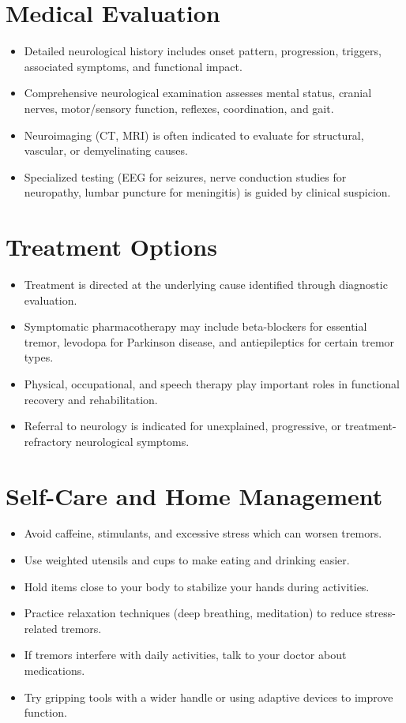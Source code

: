 \section*{Medical Evaluation}
\begin{itemize}
  \item Detailed neurological history includes onset pattern, progression, triggers, associated symptoms, and functional impact.
  \item Comprehensive neurological examination assesses mental status, cranial nerves, motor/sensory function, reflexes, coordination, and gait.
  \item Neuroimaging (CT, MRI) is often indicated to evaluate for structural, vascular, or demyelinating causes.
  \item Specialized testing (EEG for seizures, nerve conduction studies for neuropathy, lumbar puncture for meningitis) is guided by clinical suspicion.
\end{itemize}

\section*{Treatment Options}
\begin{itemize}
  \item Treatment is directed at the underlying cause identified through diagnostic evaluation.
  \item Symptomatic pharmacotherapy may include beta-blockers for essential tremor, levodopa for Parkinson disease, and antiepileptics for certain tremor types.
  \item Physical, occupational, and speech therapy play important roles in functional recovery and rehabilitation.
  \item Referral to neurology is indicated for unexplained, progressive, or treatment-refractory neurological symptoms.
\end{itemize}

\section*{Self-Care and Home Management}
\begin{itemize}
  \item Avoid caffeine, stimulants, and excessive stress which can worsen tremors.
  \item Use weighted utensils and cups to make eating and drinking easier.
  \item Hold items close to your body to stabilize your hands during activities.
  \item Practice relaxation techniques (deep breathing, meditation) to reduce stress-related tremors.
  \item If tremors interfere with daily activities, talk to your doctor about medications.
  \item Try gripping tools with a wider handle or using adaptive devices to improve function.
\end{itemize}

